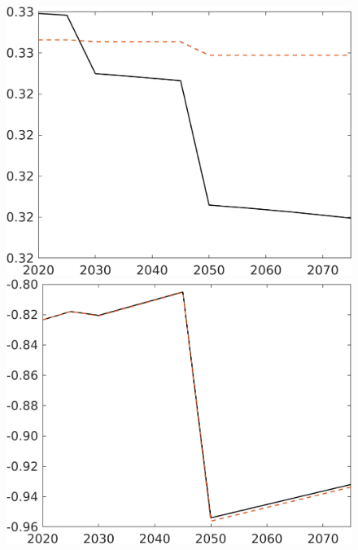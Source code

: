 \begin{figure}[h!!]
\begin{minipage}[]{0.32\textwidth}
	\end{minipage}
	\begin{minipage}[]{0.32\textwidth}
		\includegraphics[width=1\textwidth]{../../codding_model/own_basedOnFried/optimalPol_elastS_DisuSci/figures/all_1705/comp_notaul_OPT_T_NoTaus_hl_spillover0_sep1_BN0_ineq0_etaa0.79.png}
	\end{minipage}
	\begin{minipage}[]{0.32\textwidth}
		\includegraphics[width=1\textwidth]{../../codding_model/own_basedOnFried/optimalPol_elastS_DisuSci/figures/all_1705/comp_notaul_OPT_T_NoTaus_SWF_spillover0_sep1_BN0_ineq0_etaa0.79.png}

\end{minipage}
\end{figure}
